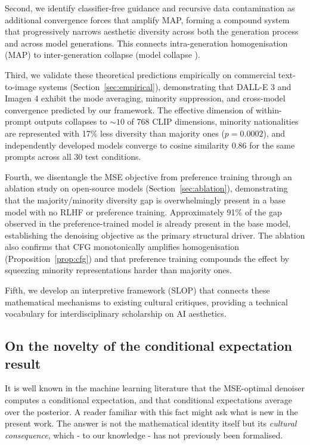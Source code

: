 \documentclass[11pt]{article}
\begin{document}
Second, we identify classifier-free guidance and recursive data contamination as additional convergence forces that amplify MAP, forming a compound system that progressively narrows aesthetic diversity across both the generation process and across model generations. This connects intra-generation homogenisation (MAP) to inter-generation collapse (model collapse \citep{Shumailov2024}).

Third, we validate these theoretical predictions empirically on commercial text-to-image systems (Section~\ref{sec:empirical}), demonstrating that DALL-E 3 and Imagen 4 exhibit the mode averaging, minority suppression, and cross-model convergence predicted by our framework. The effective dimension of within-prompt outputs collapses to ${\sim}10$ of 768 CLIP dimensions, minority nationalities are represented with 17\% less diversity than majority ones ($p = 0.0002$), and independently developed models converge to cosine similarity 0.86 for the same prompts across all 30 test conditions.

Fourth, we disentangle the MSE objective from preference training through an ablation study on open-source models (Section~\ref{sec:ablation}), demonstrating that the majority/minority diversity gap is overwhelmingly present in a base model with no RLHF or preference training. Approximately 91\% of the gap observed in the preference-trained model is already present in the base model, establishing the denoising objective as the primary structural driver. The ablation also confirms that CFG monotonically amplifies homogenisation (Proposition~\ref{prop:cfg}) and that preference training compounds the effect by squeezing minority representations harder than majority ones.

Fifth, we develop an interpretive framework (SLOP) that connects these mathematical mechanisms to existing cultural critiques, providing a technical vocabulary for interdisciplinary scholarship on AI aesthetics.

\subsection{On the novelty of the conditional expectation result}\label{sec:novelty}

It is well known in the machine learning literature that the MSE-optimal denoiser computes a conditional expectation, and that conditional expectations average over the posterior. A reader familiar with this fact might ask what is new in the present work. The answer is not the mathematical identity itself but its \textit{cultural consequence}, which - to our knowledge - has not previously been formalised.
\end{document}
